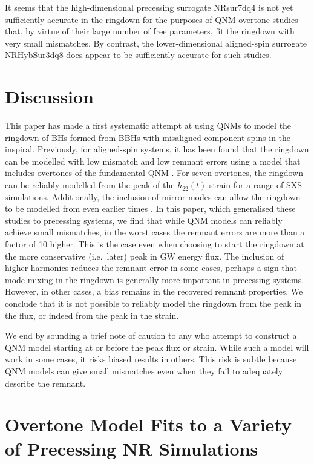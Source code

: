 It seems that the high-dimensional precessing surrogate NRsur7dq4 is not yet sufficiently accurate in the ringdown for the purposes of QNM overtone studies that, by virtue of their large number of free parameters, fit the ringdown with very small mismatches. 
By contrast, the lower-dimensional aligned-spin surrogate NRHybSur3dq8 does appear to be sufficiently accurate for such studies.


\section{Discussion} \label{sec:discussion}

This paper has made a first systematic attempt at using QNMs to model the ringdown of BHs formed from BBHs with misaligned component spins in the inspiral.
Previously, for aligned-spin systems, it has been found that the ringdown can be modelled with low mismatch and low remnant errors using a model that includes overtones of the fundamental QNM \cite{overtones}. For seven overtones, the ringdown can be reliably modelled from the peak of the $h_{22}(t)$ strain for a range of SXS simulations.
Additionally, the inclusion of mirror modes can allow the ringdown to be modelled from even earlier times \cite{mirror_modes}.
In this paper, which generalised these studies to precessing systems, we find that while QNM models can reliably achieve small mismatches, in the worst cases the remnant errors are more than a factor of 10 higher.
This is the case even when choosing to start the ringdown at the more conservative (i.e.\ later) peak in GW energy flux. 
The inclusion of higher harmonics reduces the remnant error in some cases, perhaps a sign that mode mixing in the ringdown is generally more important in precessing systems. However, in other cases, a bias remains in the recovered remnant properties.
We conclude that it is not possible to reliably model the ringdown from the peak in the flux, or indeed from the peak in the strain. 

We end by sounding a brief note of caution to any who attempt to construct a QNM model starting at or before the peak flux or strain. 
While such a model will work in some cases, it risks biased results in others. 
This risk is subtle because QNM models can give small mismatches even when they fail to adequately describe the remnant.


\section{Overtone Model Fits to a Variety of Precessing NR Simulations}\label{appendix_a}

